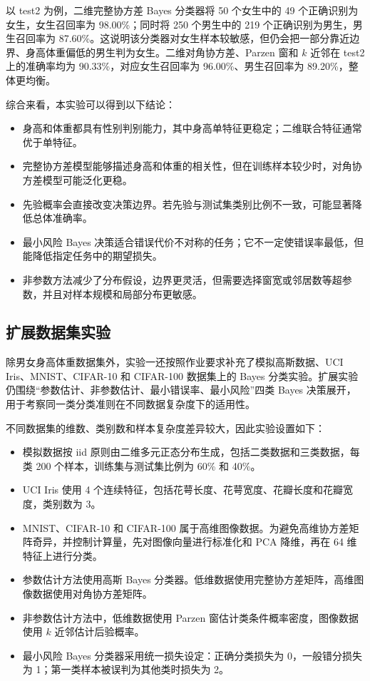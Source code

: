 \documentclass[UTF8,a4paper,12pt]{ctexart}
\begin{document}
以 test2 为例，二维完整协方差 Bayes 分类器将 50 个女生中的 49 个正确识别为女生，女生召回率为 98.00\%；同时将 250 个男生中的 219 个正确识别为男生，男生召回率为 87.60\%。这说明该分类器对女生样本较敏感，但仍会把一部分靠近边界、身高体重偏低的男生判为女生。二维对角协方差、Parzen 窗和 $k$ 近邻在 test2 上的准确率均为 90.33\%，对应女生召回率为 96.00\%、男生召回率为 89.20\%，整体更均衡。

综合来看，本实验可以得到以下结论：
\begin{itemize}
  \item 身高和体重都具有性别判别能力，其中身高单特征更稳定；二维联合特征通常优于单特征。
  \item 完整协方差模型能够描述身高和体重的相关性，但在训练样本较少时，对角协方差模型可能泛化更稳。
  \item 先验概率会直接改变决策边界。若先验与测试集类别比例不一致，可能显著降低总体准确率。
  \item 最小风险 Bayes 决策适合错误代价不对称的任务；它不一定使错误率最低，但能降低指定任务中的期望损失。
  \item 非参数方法减少了分布假设，边界更灵活，但需要选择窗宽或邻居数等超参数，并且对样本规模和局部分布更敏感。
\end{itemize}

\subsection{扩展数据集实验}

除男女身高体重数据集外，实验一还按照作业要求补充了模拟高斯数据、UCI Iris、MNIST、CIFAR-10 和 CIFAR-100 数据集上的 Bayes 分类实验。扩展实验仍围绕“参数估计、非参数估计、最小错误率、最小风险”四类 Bayes 决策展开，用于考察同一类分类准则在不同数据复杂度下的适用性。

不同数据集的维数、类别数和样本复杂度差异较大，因此实验设置如下：
\begin{itemize}
  \item 模拟数据按 iid 原则由二维多元正态分布生成，包括二类数据和三类数据，每类 200 个样本，训练集与测试集比例为 60\% 和 40\%。
  \item UCI Iris 使用 4 个连续特征，包括花萼长度、花萼宽度、花瓣长度和花瓣宽度，类别数为 3。
  \item MNIST、CIFAR-10 和 CIFAR-100 属于高维图像数据。为避免高维协方差矩阵奇异，并控制计算量，先对图像向量进行标准化和 PCA 降维，再在 64 维特征上进行分类。
  \item 参数估计方法使用高斯 Bayes 分类器。低维数据使用完整协方差矩阵，高维图像数据使用对角协方差矩阵。
  \item 非参数估计方法中，低维数据使用 Parzen 窗估计类条件概率密度，图像数据使用 $k$ 近邻估计后验概率。
  \item 最小风险 Bayes 分类器采用统一损失设定：正确分类损失为 0，一般错分损失为 1；第一类样本被误判为其他类时损失为 2。
\end{itemize}
\end{document}
